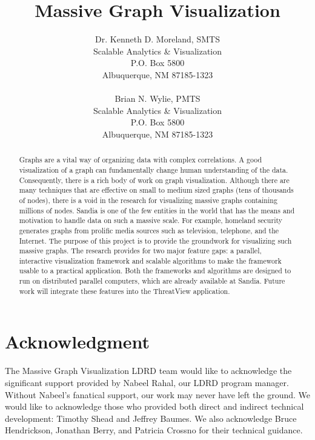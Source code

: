 \documentclass[pdf,12pt,report,strict]{SANDreport}
\title{Massive Graph Visualization}
\author{Dr. Kenneth D. Moreland, SMTS\\
Scalable Analytics \& Visualization\\
P.O. Box 5800\\
Albuquerque, NM 87185-1323\\
\\
Brian N. Wylie, PMTS\\
Scalable Analytics \& Visualization\\
P.O. Box 5800\\
Albuquerque, NM 87185-1323}
\date{}					%
\newcommand{\threatview}{ThreatView\texttrademark\xspace}
\begin{document}
\maketitle

% 
\begin{abstract}
  Graphs are a vital way of organizing data with complex correlations. A
  good visualization of a graph can fundamentally change human
  understanding of the data. Consequently, there is a rich body of work on
  graph visualization.  Although there are many techniques that are
  effective on small to medium sized graphs (tens of thousands of nodes),
  there is a void in the research for visualizing massive graphs containing
  millions of nodes. Sandia is one of the few entities in the world that
  has the means and motivation to handle data on such a massive scale. For
  example, homeland security generates graphs from prolific media sources
  such as television, telephone, and the Internet.  The purpose of this
  project is to provide the groundwork for visualizing such massive graphs.
  The research provides for two major feature gaps: a parallel, interactive
  visualization framework and scalable algorithms to make the framework
  usable to a practical application.  Both the frameworks and algorithms
  are designed to run on distributed parallel computers, which are already
  available at Sandia.  Future work will integrate these features into the
  \threatview application.
\end{abstract}


% 
\clearpage
\chapter*{Acknowledgment}

The Massive Graph Visualization LDRD team would like to acknowledge the
significant support provided by Nabeel Rahal, our LDRD program manager.
Without Nabeel's fanatical support, our work may never have left the
ground.  We would like to acknowledge those who provided both direct
and indirect technical development: Timothy Shead and Jeffrey Baumes.  We
also acknowledge Bruce Hendrickson, Jonathan Berry, and Patricia Crossno
for their technical guidance.


% 
\cleardoublepage		%
\tableofcontents
\listoffigures
\end{document}
